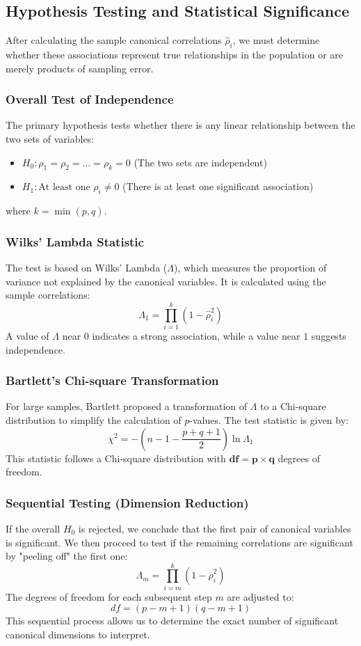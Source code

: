 \subsection{Hypothesis Testing and Statistical Significance}

After calculating the sample canonical correlations $\hat{\rho}_i$, we must determine whether these associations represent true relationships in the population or are merely products of sampling error.
\subsubsection{Overall Test of Independence}
The primary hypothesis tests whether there is any linear relationship between the two sets of variables:\begin{itemize}\item $H_0: \rho_1 = \rho_2 = \dots = \rho_k = 0$ (The two sets are independent)\item $H_1: \text{At least one } \rho_i \neq 0$ (There is at least one significant association)\end{itemize}where $k = \min(p, q)$.
\subsubsection{Wilks' Lambda Statistic}
The test is based on Wilks' Lambda ($\Lambda$), which measures the proportion of variance not explained by the canonical variables. It is calculated using the sample correlations:\begin{equation}\Lambda_1 = \prod_{i=1}^{k} (1 - \hat{\rho}_i^2)\end{equation}A value of $\Lambda$ near $0$ indicates a strong association, while a value near $1$ suggests independence.
\subsubsection{Bartlett's Chi-square Transformation}
For large samples, Bartlett proposed a transformation of $\Lambda$ to a Chi-square distribution to simplify the calculation of $p$-values. The test statistic is given by:\begin{equation}\chi^2 = - \left( n - 1 - \frac{p + q + 1}{2} \right) \ln \Lambda_1\end{equation}This statistic follows a Chi-square distribution with $\mathbf{df = p \times q}$ degrees of freedom.
\subsubsection{Sequential Testing (Dimension Reduction)}
If the overall $H_0$ is rejected, we conclude that the first pair of canonical variables is significant. We then proceed to test if the remaining correlations are significant by "peeling off" the first one:\begin{equation}\Lambda_m = \prod_{i=m}^{k} (1 - \hat{\rho}_i^2)\end{equation}The degrees of freedom for each subsequent step $m$ are adjusted to:\begin{equation}df = (p - m + 1)(q - m + 1)\end{equation}This sequential process allows us to determine the exact number of significant canonical dimensions to interpret.
